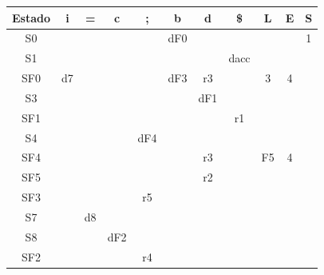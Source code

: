 \documentclass[nochap]{apuntes}
\begin{document}
\begin{problem}
\begin{tabular}{| c | c | c | c | c | c | c | c | c | c | c | }
\hline
Estado  & i & = & c & ; & b & d & \$ & L & E & S \\
\hline
S0 &  &  &  &  & dF0 &  &  &  &  & 1\\
\hline
S1 &  &  &  &  &  &  & dacc &  &  & \\
\hline
SF0 & d7 &  &  &  & dF3 & r3 &  & 3 & 4 & \\
\hline
S3 &  &  &  &  &  & dF1 &  &  &  & \\
\hline
SF1 &  &  &  &  &  &  & r1 &  &  & \\
\hline
S4 &  &  &  & dF4 &  &  &  &  &  & \\
\hline
SF4 &  &  &  &  &  & r3 &  & F5 & 4 & \\
\hline
SF5 &  &  &  &  &  & r2 &  &  &  & \\
\hline
SF3 &  &  &  & r5 &  &  &  &  &  & \\
\hline
S7 &  & d8 &  &  &  &  &  &  &  & \\
\hline
S8 &  &  & dF2 &  &  &  &  &  &  & \\
\hline
SF2 &  &  &  & r4 &  &  &  &  &  & \\
\hline
\end{tabular}

\end{problem}
\end{document}
